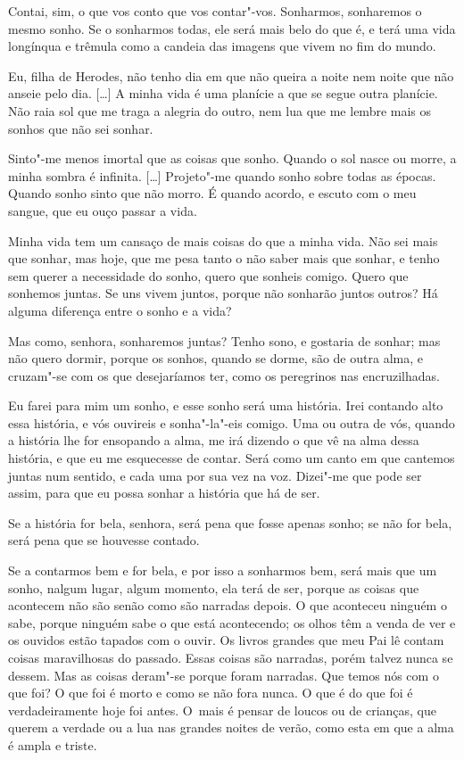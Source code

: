 Contai, sim, o que vos conto que vos contar"-vos. Sonharmos, sonharemos
o mesmo sonho. Se o sonharmos todas, ele será mais belo do que é, e
terá uma vida longínqua e trêmula como a candeia das imagens que
vivem no fim do mundo.

Eu, filha de Herodes, não tenho dia em que não queira a noite nem noite
que não anseie pelo dia. [\ldots{}] A minha vida é uma planície a que se
segue outra planície. Não raia sol que me traga a alegria do outro,
nem lua que me lembre mais os sonhos que não sei sonhar.

 Sinto"-me menos imortal que as coisas que sonho. Quando o
sol nasce ou morre, a minha sombra é infinita. [\ldots{}] Projeto"-me
quando sonho sobre todas as épocas. Quando sonho sinto que não morro.
É quando acordo, e escuto com o meu sangue, que eu ouço passar a
vida.

 Minha vida tem um cansaço de mais coisas do que a minha
vida. Não sei mais que sonhar, mas hoje, que me pesa tanto o não
saber mais que sonhar, e tenho sem querer a necessidade do sonho,
quero que sonheis comigo. Quero que sonhemos juntas. Se uns vivem
juntos, porque não sonharão juntos outros? Há alguma diferença entre
o sonho e a vida?

 Mas como, senhora, sonharemos juntas? Tenho sono, e gostaria de
sonhar; mas não quero dormir, porque os sonhos, quando se dorme, são
de outra alma, e cruzam"-se com os que desejaríamos ter, como os
peregrinos nas encruzilhadas.

 Eu farei para mim um sonho, e esse sonho será uma história.
Irei contando alto essa história, e vós ouvireis e sonha"-la"-eis
comigo. Uma ou outra de vós, quando a história lhe for ensopando a
alma, me irá dizendo o que vê na alma dessa história, e que eu me
esquecesse de contar. Será como um canto em que cantemos juntas num
sentido, e cada uma por sua vez na voz. Dizei"-me que pode ser assim,
para que eu possa sonhar a história que há de ser.

 Se a história for bela, senhora, será pena que fosse apenas
sonho; se não for bela, será pena que se houvesse contado.

 Se a contarmos bem e for bela, e por isso a sonharmos bem,
será mais que um sonho, nalgum lugar, algum momento, ela terá de ser,
porque as coisas que acontecem não são senão como são narradas
depois. O que aconteceu ninguém o sabe, porque ninguém sabe o que
está acontecendo; os olhos têm a venda de ver e os ouvidos estão
tapados com o ouvir. Os livros grandes que meu Pai lê contam coisas
maravilhosas do passado. Essas coisas são narradas, porém talvez
nunca se dessem. Mas as coisas deram"-se porque foram narradas. Que
temos nós com o que foi? O que foi é morto e como se não fora nunca.
O que é do que foi é verdadeiramente hoje foi antes. O~mais é pensar
de loucos ou de crianças, que querem a verdade ou a lua nas grandes
noites de verão, como esta em que a alma é ampla e triste.

